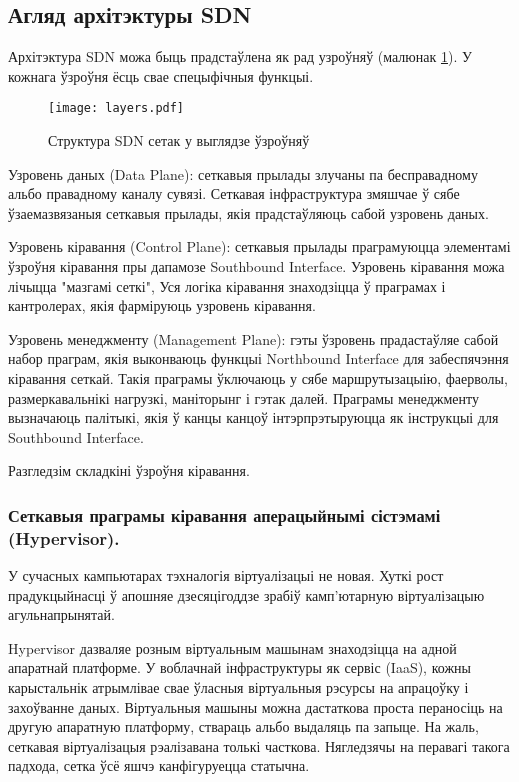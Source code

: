 \subsection{Агляд архітэктуры SDN}

Архітэктура SDN можа быць прадстаўлена як рад узроўняў (малюнак \ref{img: Layers}).
У кожнага ўзроўня ёсць свае спецыфічныя функцыі.
\begin{figure}[ht!]
    \centering
    \texttt{[image: layers.pdf]}
    \vspace{-\baselineskip}
    \caption{Структура SDN сетак у выглядзе ўзроўняў}
    \label{img: Layers}
\end{figure}

Узровень даных (Data Plane): сеткавыя прылады злучаны па бесправадному альбо
правадному каналу сувязі. Сеткавая інфраструктура змяшчае ў сябе ўзаемазвязаныя
сеткавыя прылады, якія прадстаўляюць сабой узровень даных.

Узровень кіравання (Control Plane): сеткавыя прылады праграмуюцца элементамі
ўзроўня кіравання пры дапамозе Southbound Interface. Узровень кіравання
можа лічыцца "мазгамі сеткі", Уся логіка кіравання знаходзіцца ў праграмах і кантролерах,
якія фарміруюць узровень кіравання.

Узровень менеджменту (Management Plane): гэты ўзровень прадастаўляе сабой
набор праграм, якія выконваюць функцыі Northbound Interface для забеспячэння
кіравання сеткай. Такія праграмы ўключаюць у сябе маршрутызацыію, фаерволы,
размеркавальнікі нагрузкі, маніторынг і гэтак далей.
Праграмы менеджменту вызначаюць палітыкі, якія ў канцы канцоў інтэрпрэтыруюцца
як інструкцыі для Southbound Interface.

Разгледзім складкіні ўзроўня кіравання.

\subsubsection{Сеткавыя праграмы кіравання аперацыйнымі сістэмамі (Hypervisor).}
У сучасных кампьютарах тэхналогія віртуалізацыі не новая.
Хуткі рост прадукцыйнасці ў апошняе дзесяцігоддзе зрабіў камп'ютарную віртуалізацыю
агульнапрынятай.

Hypervisor дазваляе розным віртуальным машынам знаходзіцца на адной апаратнай платформе. У воблачнай інфраструктуры як сервіс (IaaS), кожны карыстальнік
атрымлівае свае ўласныя віртуальныя рэсурсы на апрацоўку і захоўванне даных.
Віртуальныя машыны можна дастаткова проста пераносіць на другую апаратную платформу,
ствараць альбо выдаляць па запыце. На жаль, сеткавая віртуалізацыя рэалізавана
толькі часткова. Нягледзячы на перавагі такога падхода, сетка ўсё яшчэ канфігуруецца статычна.

